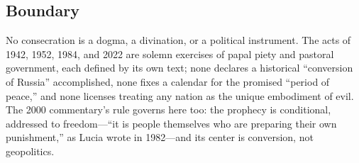 \subsection{Boundary}

No consecration is a dogma, a divination, or a political instrument.
The acts of 1942, 1952, 1984, and 2022 are solemn exercises of papal
piety and pastoral government, each defined by its own text; none
declares a historical ``conversion of Russia'' accomplished, none
fixes a calendar for the promised ``period of peace,'' and none
licenses treating any nation as the unique embodiment of evil. The
2000 commentary's rule governs here too: the prophecy is conditional,
addressed to freedom---``it is people themselves who are preparing
their own punishment,'' as Lucia wrote in 1982---and its center is
conversion, not geopolitics.
